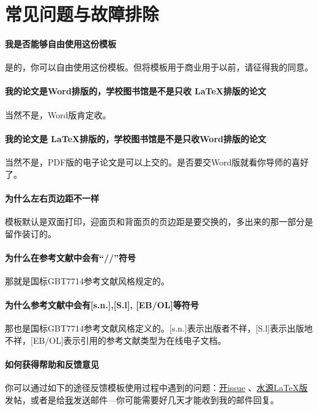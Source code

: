 
\chapter{常见问题与故障排除}
\label{chap:faq}

\subsubsection*{我是否能够自由使用这份模板}
是的，你可以自由使用这份模板。但将模板用于商业用于以前，请征得我的同意。

\subsubsection*{我的论文是Word排版的，学校图书馆是不是只收 \LaTeX 排版的论文}
当然不是，Word版肯定收。

\subsubsection*{我的论文是 \LaTeX 排版的，学校图书馆是不是只收Word排版的论文}
当然不是，PDF版的电子论文是可以上交的。是否要交Word版就看你导师的喜好了。

\subsubsection*{为什么左右页边距不一样}
模板默认是双面打印，迎面页和背面页的页边距是要交换的，多出来的那一部分是留作装订的。

\subsubsection*{为什么在参考文献中会有``//''符号}
那就是国标GBT7714参考文献风格规定的。

\subsubsection*{为什么参考文献中会有[s.n.],[S.l], [EB/OL]等符号}
那也是国标GBT7714参考文献风格定义的。[s.n.]表示出版者不祥，[S.l]表示出版地不祥，[EB/OL]表示引用的参考文献类型为在线电子文档。

\subsubsection*{如何获得帮助和反馈意见}
你可以通过如下的途径反馈模板使用过程中遇到的问题：\href{https://github.com/weijianwen/sjtu-thesis-template-latex/issues}{开issue}
、\href{https://bbs.sjtu.edu.cn/bbsdoc?board=TeX_LaTeX}{水源LaTeX版}发帖，或者是给\href{mailto:weijianwen@gmail.com}{我}发送邮件---你可能需要好几天才能收到我的邮件回复。

